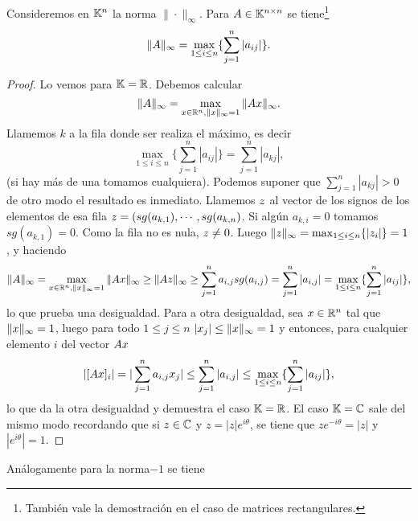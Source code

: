 \begin{ejemplo}
Consideremos en $\mathbb K^n$ la norma $\|\cdot\|_\infty$. Para $\Ab\in \Knn$ se tiene\footnote{También vale la demostración en el caso de matrices rectangulares.}
\tcc
$$
 \|\Ab\|_\infty=\max_{1\le i\le n}\{\sum_{j=1}^{n} |a_{ij}|\}.
$$
\etcc
\begin{proof}
 Lo vemos para $\mathbb K=\mathbb R$. Debemos calcular
$$\|\Ab\|_\infty =
\max_{\xb \in \R^n, \|\xb\|_\infty = 1} \|\Ab\xb\|_\infty.
 $$
 Llamemos $k$ a la fila donde ser realiza el máximo, es decir
 $$
 \max_{1\le i\le n}\{\sum_{j=1}^{n} |a_{ij}|\}=\sum_{j=1}^{n} |a_{kj}|,
 $$
 (si hay más de una tomamos cualquiera). Podemos suponer que
 $\sum_{j=1}^{n} |a_{kj}|>0$ de otro modo el resultado es inmediato. Llamemos $\zb$ al vector de los signos de los elementos de esa fila $\zb=(sg(a_{k,1}),\cdots ,sg(a_{k,n})$. Si algún $a_{k,i}=0$ tomamos $sg(a_{k,1})=0$. Como la fila no es nula, $\zb\neq\cero$. Luego $\|\zb\|_\infty=\max_{1\le i\le n}\{|z_i|\}=1$, y  haciendo
 $$
\|\Ab\|_\infty =\max_{\xb \in \R^n, \|\xb\|_\infty = 1} \|\Ab\xb\|_\infty
 \ge \|\Ab\zb\|_\infty\ge \sum_{j=1}^n a_{i,j}sg(a_{i,j})=\sum_{j=1}^n |a_{i,j}|=\max_{1\le i\le n}\{\sum_{j=1}^{n} |a_{ij}|\},
 $$
 lo que prueba una desigualdad. Para a otra desigualdad, sea $\xb\in \R^n$ tal que $\|\xb\|_\infty=1$, luego para todo $1\le j\le n$ $|x_j|\le \|\xb\|_\infty=1$ y entonces, para cualquier elemento $i$ del vector $\Ab\xb$
$$
|[\Ab\xb]_i|=|\sum_{j=1}^na_{i,j}x_j |\le \sum_{j=1}^n|a_{i,j}|\le \max_{1\le i\le n}\{\sum_{j=1}^{n} |a_{ij}|\},
$$
lo que da la otra desigualdad y demuestra el caso $\mathbb K=\mathbb R$.
El caso $\mathbb K=\mathbb C$ sale del mismo modo recordando que si $z\in \mathbb C$ y $z=|z|e^{i\theta}$, se tiene que $ze^{-i\theta}=|z|$ y $|e^{i\theta}|=1$.
\end{proof}
Análogamente para la norma$-1$ se tiene
\end{ejemplo}

